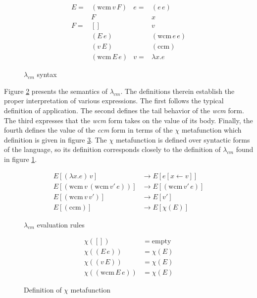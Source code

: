 \documentclass[ms]{byuprop}
\newcounter{definition}
\begin{document}
\begin{figure}
\begin{align*}
E = &(\mathrm{wcm}\,v\,F) & e = &(e\,e)\\
    &F                    &     &x\\
F = &[]                   &     &v\\
    &(E\,e)               &     &(\mathrm{wcm}\,e\,e)\\
    &(v\,E)               &     &(\mathrm{ccm})\\
    &(\mathrm{wcm}\,E\,e) & v = & \lambda x. e
\end{align*}
\caption{$\lambda_{cm}$ syntax}
\label{language-grammar}
\end{figure}

Figure \ref{language-semantics} presents the semantics of $\lambda_{cm}$. The 
definitions therein establish the proper interpretation of various expressions. 
The first follows the typical definition of application. The second defines 
the tail behavior of the \emph{wcm} form. The third expresses that the 
\emph{wcm} form takes on the value of its body. Finally, the fourth defines 
the value of the \emph{ccm} form in terms of the $\chi$ metafunction which 
definition is given in figure \ref{chi-metafunction}.
The $\chi$ metafunction is defined over syntactic forms of the language, so its 
definition corresponds closely to the definition of $\lambda_{cm}$ found in 
figure \ref{language-grammar}.

\begin{figure}
\begin{align*}
E[(\lambda x.e)\,v]                         &\rightarrow E[e[x\leftarrow v]]\\
E[(\mathrm{wcm}\,v\,(\mathrm{wcm}\,v'\,e))] &\rightarrow E[(\mathrm{wcm}\,v'\,e)]\\
E[(\mathrm{wcm}\,v\,v')]                    &\rightarrow E[v']\\
E[(\mathrm{ccm})]                           &\rightarrow E[\chi(E)]
\end{align*}
\caption{$\lambda_{cm}$ evaluation rules}
\label{language-semantics}
\end{figure}

\begin{figure}
\begin{align*}
\chi([])                   &= \mathrm{empty}\\
\chi((E\,e))               &= \chi(E)\\
\chi((v\,E))               &= \chi(E)\\
\chi((\mathrm{wcm}\,E\,e)) &= \chi(E)
\end{align*}
\caption{Definition of $\chi$ metafunction}
\label{chi-metafunction}
\end{figure}
\end{document}
